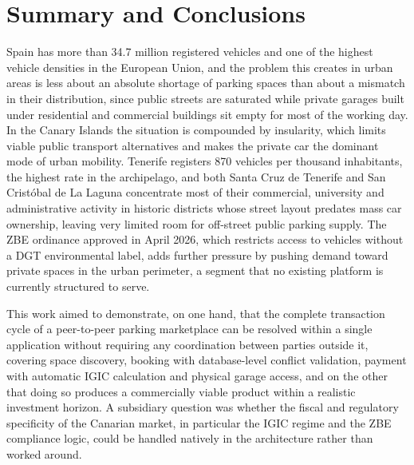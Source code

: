\chapter{Summary and Conclusions}
\label{ch:conclusions}

Spain has more than 34.7 million registered vehicles and one of the highest vehicle densities in the European Union, and the problem this creates in urban areas is less about an absolute shortage of parking spaces than about a mismatch in their distribution, since public streets are saturated while private garages built under residential and commercial buildings sit empty for most of the working day. In the Canary Islands the situation is compounded by insularity, which limits viable public transport alternatives and makes the private car the dominant mode of urban mobility. Tenerife registers 870 vehicles per thousand inhabitants, the highest rate in the archipelago, and both Santa Cruz de Tenerife and San Cristóbal de La Laguna concentrate most of their commercial, university and administrative activity in historic districts whose street layout predates mass car ownership, leaving very limited room for off-street public parking supply. The ZBE ordinance approved in April 2026, which restricts access to vehicles without a DGT environmental label, adds further pressure by pushing demand toward private spaces in the urban perimeter, a segment that no existing platform is currently structured to serve.

This work aimed to demonstrate, on one hand, that the complete transaction cycle of a peer-to-peer parking marketplace can be resolved within a single application without requiring any coordination between parties outside it, covering space discovery, booking with database-level conflict validation, payment with automatic IGIC calculation and physical garage access, and on the other that doing so produces a commercially viable product within a realistic investment horizon. A subsidiary question was whether the fiscal and regulatory specificity of the Canarian market, in particular the IGIC regime and the ZBE compliance logic, could be handled natively in the architecture rather than worked around.

